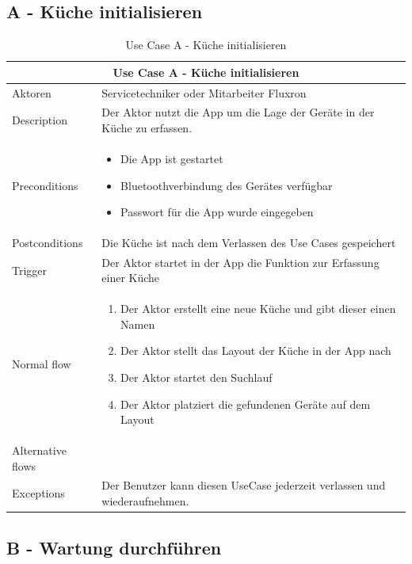 \subsection{A - Küche initialisieren}
\label{subsec:A - Küche initialisieren}

\begin{table}[H]
\begin{tabular}{|p{3cm}|p{10cm}|}
  \hline
  \multicolumn{2}{|c|}{Use Case A - Küche initialisieren}
  \\\hline
  	Aktoren
  &
  	Servicetechniker oder Mitarbeiter Fluxron
  \\\hline
  	Description 
  &
  	Der Aktor nutzt die App um die Lage der Geräte in der Küche zu erfassen.
  \\\hline
  	Preconditions 
  & 
  	\begin{itemize}
	  \item Die App ist gestartet
	  \item Bluetoothverbindung des Gerätes verfügbar
	  \item Passwort für die App wurde eingegeben
  	\end{itemize}
  \\\hline
  	Postconditions
  &
    Die Küche ist nach dem Verlassen des Use Cases gespeichert
  \\\hline
  	Trigger
  &
    Der Aktor startet in der App die Funktion zur Erfassung einer Küche
  \\\hline
  	Normal flow
  &
	\begin{enumerate}
	  \item Der Aktor erstellt eine neue Küche und gibt dieser einen Namen
      \item Der Aktor stellt das Layout der Küche in der App nach
	  \item Der Aktor startet den Suchlauf
      \item Der Aktor platziert die gefundenen Geräte auf dem Layout
	\end{enumerate}
  \\\hline
    Alternative flows
  &
    
  \\\hline
    Exceptions
  &
    Der Benutzer kann diesen UseCase jederzeit verlassen und wiederaufnehmen.
  \\\hline
\end{tabular}
\caption{Use Case A - Küche initialisieren}
\end{table}

\subsection{B - Wartung durchführen}
\label{subsec:B - Wartung durchführen}

